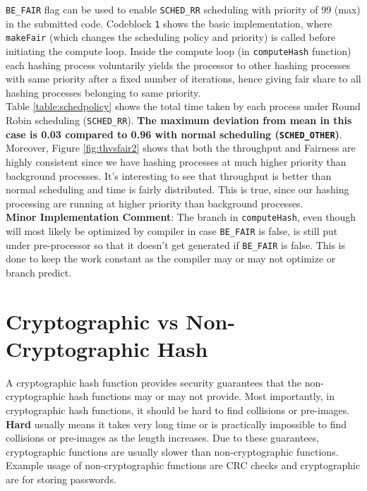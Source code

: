 \documentclass[10pt] {article}
\begin{document}
\noindent \texttt{BE\_FAIR} flag can be used to enable \texttt{SCHED\_RR} scheduling with priority of 99 (max) in the submitted code. Codeblock \texttt{1} shows the basic implementation, where \texttt{makeFair} (which changes the scheduling policy and priority) is called before initiating the compute loop. Inside the compute loop (in \texttt{computeHash} function) each hashing process voluntarily yields the processor to other hashing processes with same priority after a fixed number of iterations, hence giving fair share to all hashing processes belonging to same priority.\\

\noindent Table \ref{table:schedpolicy} shows the total time taken by each process under Round Robin scheduling (\texttt{SCHED\_RR}). \textbf{The maximum deviation from mean in this case is 0.03 compared to 0.96 with normal scheduling (\texttt{SCHED\_OTHER})}. \\

\noindent Moreover, Figure \ref{fig:thvsfair2} shows that both the throughput and Fairness are highly consistent since we have hashing processes at much higher priority than background processes. It's interesting to see that throughput is better than normal scheduling and time is fairly distributed. This is true, since our hashing processing are running at higher priority than  background processes. \\

\noindent \textbf{Minor Implementation Comment}: The branch in \texttt{computeHash}, even though will most likely be optimized by compiler in case \texttt{BE\_FAIR} is false, is still put under pre-processor so that it doesn't get generated if \texttt{BE\_FAIR} is false. This is done to keep the work constant as the compiler may or may not optimize or branch predict.

\section{Cryptographic vs Non-Cryptographic Hash}
A cryptographic hash function provides security guarantees that the non-cryptographic hash functions may or may not provide. Most importantly, in cryptographic hash functions, it should be hard to find collisions or pre-images. \textbf{Hard} usually means it takes very long time or is practically impossible to find collisions or pre-images as the length increases. Due to these guarantees, cryptographic functions are usually slower than non-cryptographic functions. Example usage of non-cryptographic functions are CRC checks and cryptographic are for storing passwords.\\
\end{document}

